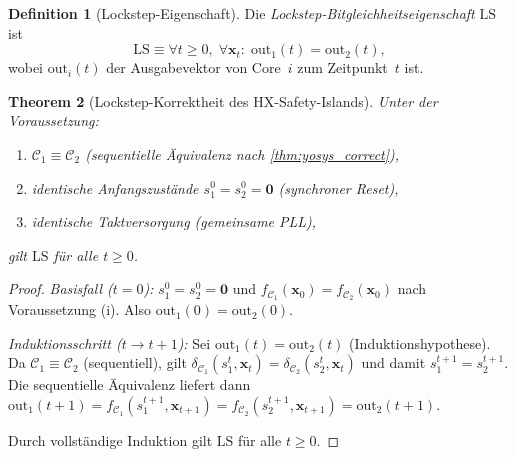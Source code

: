 ﻿\documentclass[a4paper,12pt]{article}
\theoremstyle{plain}
\newtheorem{theorem}{Theorem}[section]
\theoremstyle{definition}
\newtheorem{definition}[theorem]{Definition}
\theoremstyle{remark}
\begin{document}
\begin{definition}[Lockstep-Eigenschaft]\label{def:lockstep}
Die \emph{Lockstep-Bitgleichheitseigenschaft} $\mathrm{LS}$ ist
\[
  \mathrm{LS} \equiv \forall t \geq 0,\; \forall \mathbf{x}_t:\;
  \text{out}_1(t) = \text{out}_2(t),
\]
wobei $\text{out}_i(t)$ der Ausgabevektor von Core~$i$ zum Zeitpunkt~$t$ ist.
\end{definition}

\begin{theorem}[Lockstep-Korrektheit des HX-Safety-Islands]
\label{thm:lockstep}
Unter der Voraussetzung:
\begin{enumerate}[label=(\roman*)]
  \item $\mathcal{C}_1 \equiv \mathcal{C}_2$
        (sequentielle Äquivalenz nach \cref{thm:yosys_correct}),
  \item identische Anfangszustände $s_1^0 = s_2^0 = \mathbf{0}$
        (synchroner Reset),
  \item identische Taktversorgung (gemeinsame PLL),
\end{enumerate}
gilt $\mathrm{LS}$ für alle $t \geq 0$.
\end{theorem}
\begin{proof}
\textit{Basisfall ($t=0$):}
$s_1^0 = s_2^0 = \mathbf{0}$ und $f_{\mathcal{C}_1}(\mathbf{x}_0) = f_{\mathcal{C}_2}(\mathbf{x}_0)$
nach Voraussetzung (i). Also $\text{out}_1(0) = \text{out}_2(0)$.

\textit{Induktionsschritt ($t \to t+1$):}
Sei $\text{out}_1(t) = \text{out}_2(t)$ (Induktionshypothese).
Da $\mathcal{C}_1 \equiv \mathcal{C}_2$ (sequentiell), gilt
$\delta_{\mathcal{C}_1}(s_1^t, \mathbf{x}_t) = \delta_{\mathcal{C}_2}(s_2^t, \mathbf{x}_t)$
und damit $s_1^{t+1} = s_2^{t+1}$.
Die sequentielle Äquivalenz liefert dann
$\text{out}_1(t+1) = f_{\mathcal{C}_1}(s_1^{t+1}, \mathbf{x}_{t+1})
= f_{\mathcal{C}_2}(s_2^{t+1}, \mathbf{x}_{t+1}) = \text{out}_2(t+1)$.

Durch vollständige Induktion gilt $\mathrm{LS}$ für alle $t \geq 0$.
\end{proof}
\end{document}
